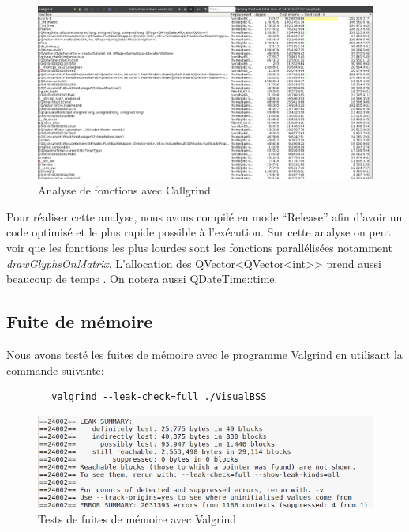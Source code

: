 \documentclass[12pt]{article}
\begin{document}
		\begin{figure}[!h]
		\begin{center}
		\includegraphics[scale=.38]{callgrind_analyse.png}
		\caption{Analyse de fonctions avec Callgrind}
		\label{fig:callgrind}
		\end{center}
		\end{figure}
	
		Pour réaliser cette analyse, nous avons compilé en mode “Release” afin d’avoir
		un code optimisé et le plus rapide possible à l’exécution.
		Sur cette analyse on peut voir que les fonctions les plus lourdes sont les fonctions
		parallélisées notamment \textit{drawGlyphsOnMatrix}. L’allocation des QVector<QVector<int>>
		prend aussi beaucoup de temps . On notera aussi QDateTime::time.
		
		\subsection{Fuite de mémoire}
		Nous avons testé les fuites de mémoire avec le programme Valgrind en utilisant la
		commande suivante:
	
		\begin{verbatim}	
		valgrind --leak-check=full ./VisualBSS
		\end{verbatim}
	
		\begin{figure}[!h]
		\begin{center}
		\includegraphics[scale=.8]{memory_leak.png}
		\caption{Tests de fuites de mémoire avec Valgrind}
		\end{center}
		\end{figure}	
	
\end{document}
